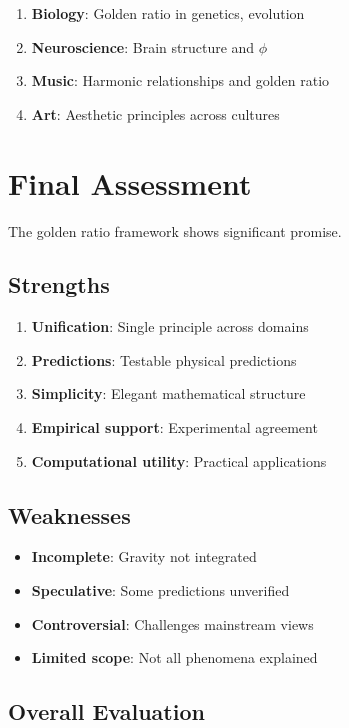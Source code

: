 \begin{enumerate}
    \item \textbf{Biology}: Golden ratio in genetics, evolution
    \item \textbf{Neuroscience}: Brain structure and $\phi$
    \item \textbf{Music}: Harmonic relationships and golden ratio
    \item \textbf{Art}: Aesthetic principles across cultures
\end{enumerate}

\section{Final Assessment}

The golden ratio framework shows significant promise.

\subsection{Strengths}

\begin{enumerate}
    \item \textbf{Unification}: Single principle across domains
    \item \textbf{Predictions}: Testable physical predictions
    \item \textbf{Simplicity}: Elegant mathematical structure
    \item \textbf{Empirical support}: Experimental agreement
    \item \textbf{Computational utility}: Practical applications
\end{enumerate}

\subsection{Weaknesses}

\begin{itemize}
    \item \textbf{Incomplete}: Gravity not integrated
    \item \textbf{Speculative}: Some predictions unverified
    \item \textbf{Controversial}: Challenges mainstream views
    \item \textbf{Limited scope}: Not all phenomena explained
\end{itemize}

\subsection{Overall Evaluation}

